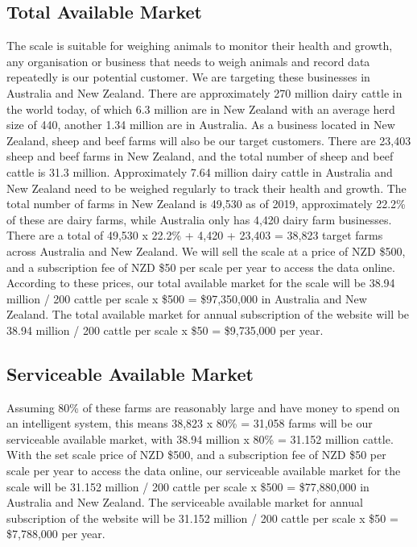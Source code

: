 \subsection{Total Available Market}
The scale is suitable for weighing animals to monitor their health and growth, any organisation or business that needs to weigh animals and record data repeatedly is our potential customer. We are targeting these businesses in Australia and New Zealand. There are approximately 270 million dairy cattle in the world today\cite{ip1}, of which 6.3 million are in New Zealand with an average herd size of 440\cite{ip2}, another 1.34 million are in Australia\cite{ip3}. As a business located in New Zealand, sheep and beef farms will also be our target customers. There are 23,403 sheep and beef farms in New Zealand, and the total number of sheep and beef cattle is 31.3 million\cite{ip4}. Approximately 7.64 million dairy cattle in Australia and New Zealand need to be weighed regularly to track their health and growth. The total number of farms in New Zealand is 49,530 as of 2019, approximately 22.2\% of these are dairy farms\cite{ip5}, while Australia only has 4,420 dairy farm businesses\cite{ip6}. There are a total of 49,530 x 22.2\% + 4,420 + 23,403 = 38,823 target farms across Australia and New Zealand.
We will sell the scale at a price of NZD \$500, and a subscription fee of NZD \$50 per scale per year to access the data online. According to these prices, our total available market for the scale will be 38.94 million / 200 cattle per scale x \$500 = \$97,350,000 in Australia and New Zealand. The total available market for annual subscription of the website will be 38.94 million / 200 cattle per scale x \$50 = \$9,735,000 per year.

\subsection{Serviceable Available Market}

Assuming 80\% of these farms are reasonably large and have money to spend on an intelligent system, this means 38,823 x 80\% = 31,058 farms will be our serviceable available market, with 38.94 million x 80\% = 31.152 million cattle.
With the set scale price of NZD \$500, and a subscription fee of NZD \$50 per scale per year to access the data online, our serviceable available market for the scale will be 31.152 million / 200 cattle per scale x \$500 = \$77,880,000 in Australia and New Zealand. The serviceable available market for annual subscription of the website will be 31.152 million / 200 cattle per scale x \$50 = \$7,788,000 per year.

